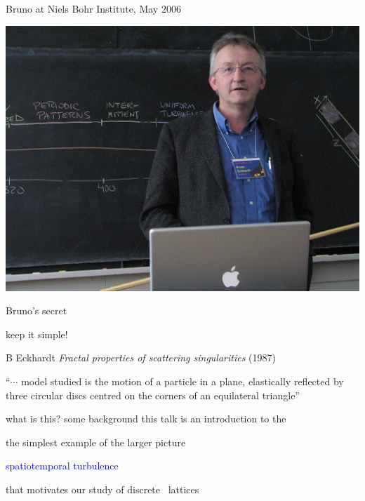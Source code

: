 \begin{frame}{Bruno at Niels Bohr Institute, May 2006}
\begin{center}
\hfill\includegraphics[width=1.00\textheight]{060519BrunoNBI}
\end{center}
\end{frame}

\begin{frame}{Bruno's secret}
\vfill

\begin{center}
{\Large keep it simple!}
\end{center}

\vfill
B Eckhardt
{\em Fractal properties of scattering singularities}
(1987)
\bigskip

``$\cdots$ model studied is the motion of a particle in a plane,
elastically reflected by three circular discs centred on the corners of
an equilateral triangle''
\end{frame}

\begin{frame}{what is this? some background}
this talk is an introduction to the

\begin{center}
    {\textcolor{blue}{\catlatt}}
\end{center}

the simplest example of the larger picture

\bigskip
\begin{center}
 \textcolor{blue}{spatiotemporal turbulence}
\end{center}

\bigskip
that motivates our study of discrete \spt\ lattices
\end{frame}


